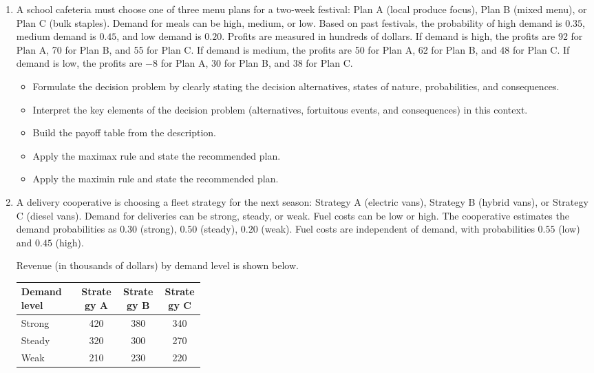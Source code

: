 \begin{enumerate}
	\item A school cafeteria must choose one of three menu plans for a two-week festival: Plan A (local produce focus),
	Plan B (mixed menu), or Plan C (bulk staples). Demand for meals can be high, medium, or low.
	Based on past festivals, the probability of high demand is $0.35$, medium demand is $0.45$, and low demand is $0.20$.
	Profits are measured in hundreds of dollars. If demand is high, the profits are 92 for Plan A, 70 for Plan B, and 55 for Plan C.
	If demand is medium, the profits are 50 for Plan A, 62 for Plan B, and 48 for Plan C. If demand is low, the profits are
	$-8$ for Plan A, 30 for Plan B, and 38 for Plan C.

	\begin{itemize}
		\item Formulate the decision problem by clearly stating the decision alternatives, states of nature, probabilities, and consequences.
		\item Interpret the key elements of the decision problem (alternatives, fortuitous events, and consequences) in this context.
		\item Build the payoff table from the description.
		\item Apply the maximax rule and state the recommended plan.
		\item Apply the maximin rule and state the recommended plan.
	\end{itemize}
	\item A delivery cooperative is choosing a fleet strategy for the next season: Strategy A (electric vans),
	Strategy B (hybrid vans), or Strategy C (diesel vans). Demand for deliveries can be strong, steady, or weak.
	Fuel costs can be low or high. The cooperative estimates the demand probabilities as $0.30$ (strong), $0.50$ (steady),
	$0.20$ (weak). Fuel costs are independent of demand, with probabilities $0.55$ (low) and $0.45$ (high).

	Revenue (in thousands of dollars) by demand level is shown below.
	\begin{center}
		\begin{tabularx}{0.8\linewidth}{@{}L{0.32\linewidth}C C C@{}}
			\toprule
			Demand level & Strategy A & Strategy B & Strategy C \\
			\midrule
			Strong & 420 & 380 & 340 \\
			Steady & 320 & 300 & 270 \\
			Weak & 210 & 230 & 220 \\
			\bottomrule
		\end{tabularx}
	\end{center}


\end{enumerate}
